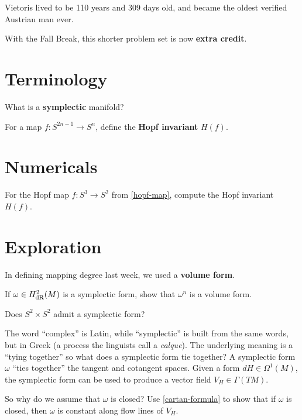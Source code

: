 \documentclass{homework}
\author{Jim Fowler}
\begin{document}
\maketitle

\begin{inspiration}
  Vietoris lived to be 110 years and 309 days old, and became the oldest verified Austrian man ever.
\end{inspiration}

With the Fall Break, this shorter problem set is now \textbf{extra
credit}.

\section{Terminology}

\begin{problem}
  What is a \textbf{symplectic} manifold?
\end{problem}

\begin{problem}
 For a map $f : S^{2n-1} \to S^n$, define the \textbf{Hopf invariant} $H(f)$.
\end{problem}

\section{Numericals}

\begin{problem}
For the Hopf map $f : S^3 \to S^2$ from \ref{hopf-map}, compute the Hopf invariant $H(f)$.
\end{problem}

\section{Exploration}

\begin{problem}
  In defining mapping degree last week, we used a \textbf{volume form}.

  If $\omega \in H_{\operatorname{dR}}^2(M)$ is a symplectic form, show that $\omega^n$ is a volume form.
  \end{problem}

  \begin{problem}
  Does $S^2 \times S^2$ admit a symplectic form?
\end{problem}

\begin{problem} The word ``complex'' is Latin, while ``symplectic'' is
built from the same words, but in Greek (a process the linguists call
a \textit{calque}).  The underlying meaning is a ``tying together'' so
what does a symplectic form tie together?  A symplectic form $\omega$
``ties together'' the tangent and cotangent spaces.  Given a form $dH
\in \Omega^1(M)$, the symplectic form can be used to produce a vector
field $V_H \in \Gamma(TM)$.

So why do we assume that $\omega$ is closed?  Use \ref{cartan-formula}
to show that if $\omega$ is closed, then $\omega$ is constant along
flow lines of $V_H$.
\end{problem}
\end{document}
